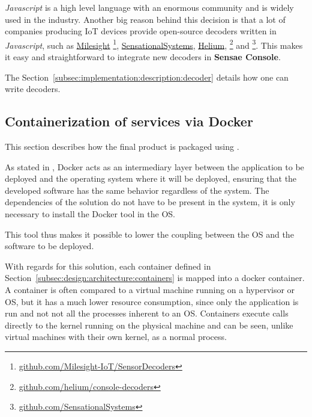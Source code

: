 \textit{Javascript} is a high level language with an enormous community and is widely used in the industry. Another big reason behind this decision is that a lot of companies producing \gls{IoT} devices provide open-source decoders written in \textit{Javascript}, such as \href{https://github.com/Milesight-IoT/SensorDecoders}{Milesight}
\footnote{\href {https://github.com/Milesight-IoT/SensorDecoders}{github.com/Milesight-IoT/SensorDecoders}}, \href{https://github.com/SensationalSystems}{SensationalSystems}, \href{https://github.com/helium/console-decoders}{Helium}, 
\footnote{\href {https://github.com/helium/console-decoders}{github.com/helium/console-decoders}} and
\footnote{\href {https://github.com/SensationalSystems}{github.com/SensationalSystems}}. This makes it easy and straightforward to integrate new decoders in \textbf{Sensae Console}.

The Section~\ref{subsec:implementation:description:decoder} details how one can write decoders.

\subsection{Containerization of services via Docker}
\label{subsec:implementation:decisions:docker}

This section describes how the final product is packaged using .

As stated in , Docker acts as an intermediary layer between the application to be deployed and the operating system where it will be deployed, ensuring that the developed software has the same behavior regardless of the system. The dependencies of the solution do not have to be present in the system, it is only necessary to install the Docker tool in the \gls{OS}.

This tool thus makes it possible to lower the coupling between the \gls{OS} and the software to be deployed.

With regards for this solution, each container defined in Section~\ref{subsec:design:architecture:containers} is mapped into a docker container.
A container is often compared to a virtual machine running on a hypervisor or
\gls{OS}, but it has a much lower resource consumption, since only the application is run and not not all the processes inherent to an \gls{OS}. Containers execute calls directly to the kernel running on the physical machine and can be seen, unlike virtual machines with their own kernel, as a normal process.

